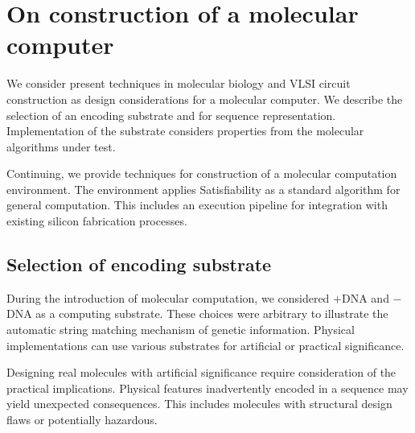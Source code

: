 \FloatBarrier


\section{On construction of a molecular computer}


We consider present techniques in molecular biology and VLSI circuit construction as design considerations for a molecular computer.  We describe the selection of an encoding substrate and for sequence representation.  Implementation of the substrate considers properties from the molecular algorithms under test. 


Continuing, we provide techniques for construction of a molecular computation environment.  The environment applies {\sc Satisfiability} as a standard algorithm for general computation.  This includes an execution pipeline for integration with existing silicon fabrication processes.
		
		\subsection{Selection of encoding substrate}
		
During the introduction of molecular computation, we considered $+$DNA and $-$DNA as a computing substrate.  These choices were arbitrary to illustrate the automatic string matching mechanism of genetic information.  Physical implementations can use various substrates for artificial or practical significance.
			

Designing real molecules with artificial significance require consideration of the practical implications.  Physical features inadvertently encoded in a sequence may yield unexpected consequences.  This includes molecules with structural design flaws or potentially hazardous.
			
			

